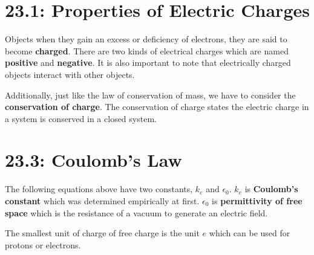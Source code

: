\documentclass[12pt, titlepage, oneside]{article}
\begin{document}
	\section*{23.1: Properties of Electric Charges}
	
	Objects when they gain an excess or deficiency of electrons, they are said to become \textbf{charged}. There are two kinds of electrical charges which are named \textbf{positive} and \textbf{negative}. It is also important to note that electrically charged objects interact with other objects. 
	\vspace{2mm}
	
				\noindent{}	
	\vspace{2mm}
	
	Additionally, just like the law of conservation of mass, we have to consider the \textbf{conservation of charge}. The conservation of charge states the electric charge in a system is conserved in a closed system.
	\section*{23.3: Coulomb's Law}
	
	\noindent{}	
	\vspace{1mm}

	The following equations above have two constants, $k_e$ and $\epsilon_0$. $k_e$ is \textbf{Coulomb's constant} which was determined empirically at first. $\epsilon_0$ is \textbf{permittivity of free space} which is the resistance of a vacuum to generate an electric field.
	
	The smallest unit of charge of free charge is the unit $e$ which can be used for protons or electrons.
	\vspace{2mm}
	
	\noindent{}
\end{document}
